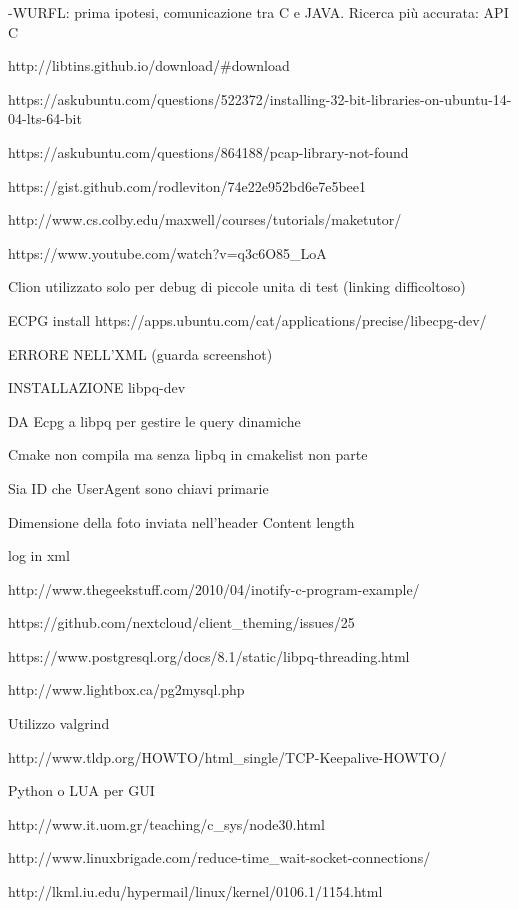\documentclass[a4paper, titlepage]{article}
\begin{document}
	\begin{flushleft}
		-WURFL: prima ipotesi, comunicazione tra C e JAVA. Ricerca più accurata: API C
		
		http://libtins.github.io/download/\#download
		
		https://askubuntu.com/questions/522372/installing-32-bit-libraries-on-ubuntu-14-04-lts-64-bit
		
		https://askubuntu.com/questions/864188/pcap-library-not-found
		
		https://gist.github.com/rodleviton/74e22e952bd6e7e5bee1
		
		http://www.cs.colby.edu/maxwell/courses/tutorials/maketutor/
		
		https://www.youtube.com/watch?v=q3c6O85\_LoA
		
		Clion utilizzato solo per debug di piccole unita di test (linking difficoltoso)
		
		ECPG install	https://apps.ubuntu.com/cat/applications/precise/libecpg-dev/
		
		ERRORE NELL'XML (guarda screenshot)
		
		INSTALLAZIONE libpq-dev
		
		DA Ecpg a libpq per gestire le query dinamiche
		
		Cmake non compila ma senza lipbq in cmakelist non parte
		
		Sia ID che UserAgent sono chiavi primarie
		
		Dimensione della foto inviata nell'header Content length
		
		log in xml
		
		http://www.thegeekstuff.com/2010/04/inotify-c-program-example/
		
		https://github.com/nextcloud/client\_theming/issues/25
		
		https://www.postgresql.org/docs/8.1/static/libpq-threading.html
		
		http://www.lightbox.ca/pg2mysql.php
		
		Utilizzo valgrind
		
		http://www.tldp.org/HOWTO/html\_single/TCP-Keepalive-HOWTO/
		
		Python o LUA per GUI
		
		http://www.it.uom.gr/teaching/c\_sys/node30.html
		
		http://www.linuxbrigade.com/reduce-time\_wait-socket-connections/
		
		http://lkml.iu.edu/hypermail/linux/kernel/0106.1/1154.html
	\end{flushleft}
	
\end{document}
